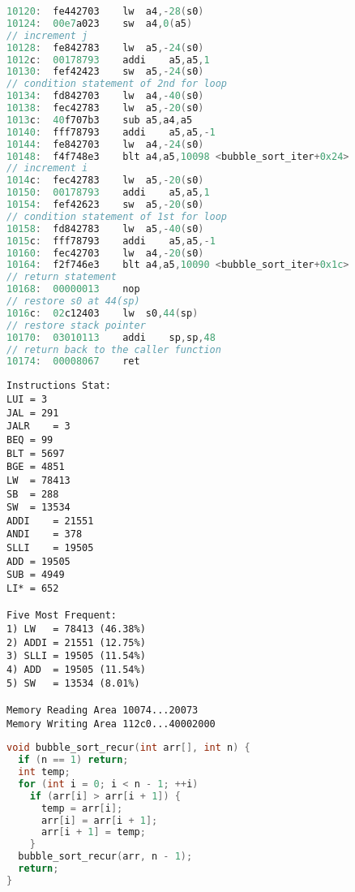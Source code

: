 \documentclass[
    a4paper,
    oneside,
    adjustmath,
    finemath,
    itemph,
    nonfrench,
    11pt
]{oblivoir}
\begin{document}
\begin{lstlisting}[language=C, caption=RV32I code of iterative bubble sort, label=lst:iter_RV32I]
10120:	fe442703	lw	a4,-28(s0)
10124:	00e7a023	sw	a4,0(a5)
// increment j
10128:	fe842783	lw	a5,-24(s0)
1012c:	00178793	addi	a5,a5,1
10130:	fef42423	sw	a5,-24(s0)
// condition statement of 2nd for loop
10134:	fd842703	lw	a4,-40(s0)
10138:	fec42783	lw	a5,-20(s0)
1013c:	40f707b3	sub	a5,a4,a5
10140:	fff78793	addi	a5,a5,-1
10144:	fe842703	lw	a4,-24(s0)
10148:	f4f748e3	blt	a4,a5,10098 <bubble_sort_iter+0x24>
// increment i
1014c:	fec42783	lw	a5,-20(s0)
10150:	00178793	addi	a5,a5,1
10154:	fef42623	sw	a5,-20(s0)
// condition statement of 1st for loop
10158:	fd842783	lw	a5,-40(s0)
1015c:	fff78793	addi	a5,a5,-1
10160:	fec42703	lw	a4,-20(s0)
10164:	f2f746e3	blt	a4,a5,10090 <bubble_sort_iter+0x1c>
// return statement
10168:	00000013	nop
// restore s0 at 44(sp)
1016c:	02c12403	lw	s0,44(sp)
// restore stack pointer
10170:	03010113	addi	sp,sp,48
// return back to the caller function
10174:	00008067	ret
    \end{lstlisting}
    \begin{lstlisting}[caption=instructions stat of iterative bubble sort, label=lst:iter_stat]
Instructions Stat:
LUI	= 3
JAL	= 291
JALR	= 3
BEQ	= 99
BLT	= 5697
BGE	= 4851
LW	= 78413
SB	= 288
SW	= 13534
ADDI	= 21551
ANDI	= 378
SLLI	= 19505
ADD	= 19505
SUB	= 4949
LI*	= 652

Five Most Frequent:
1) LW	= 78413 (46.38%)
2) ADDI	= 21551 (12.75%)
3) SLLI	= 19505 (11.54%)
4) ADD	= 19505 (11.54%)
5) SW	= 13534 (8.01%)

Memory Reading Area 10074...20073
Memory Writing Area 112c0...40002000
    \end{lstlisting}
    \begin{lstlisting}[language=C, caption=C code of recursive bubble sort, label=lst:recur_C]
void bubble_sort_recur(int arr[], int n) {
  if (n == 1) return;
  int temp;
  for (int i = 0; i < n - 1; ++i)
    if (arr[i] > arr[i + 1]) {
      temp = arr[i];
      arr[i] = arr[i + 1];
      arr[i + 1] = temp;
    }
  bubble_sort_recur(arr, n - 1);
  return;
}
    \end{lstlisting}
\end{document}
